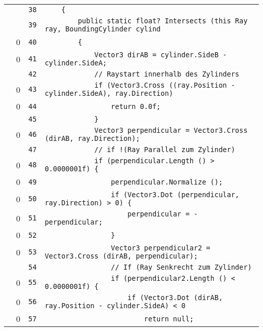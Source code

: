 \documentclass[a4paper,10pt]{article}
\begin{document}
\begin{longtable}[l]{lrrl}
\cellcolor{gray} &  & \verb~38~ & \verb~    {~\\
\cellcolor{gray} &  & \verb~39~ & \verb~        public static float? Intersects (this Ray ray, BoundingCylinder cylind~\\
\cellcolor{red} & 0 & \verb~40~ & \verb~        {~\\
\cellcolor{red} & 0 & \verb~41~ & \verb~            Vector3 dirAB = cylinder.SideB - cylinder.SideA;~\\
\cellcolor{gray} &  & \verb~42~ & \verb~            // Raystart innerhalb des Zylinders~\\
\cellcolor{red} & 0 & \verb~43~ & \verb~            if (Vector3.Cross ((ray.Position - cylinder.SideA), ray.Direction)~\\
\cellcolor{red} & 0 & \verb~44~ & \verb~                return 0.0f;~\\
\cellcolor{gray} &  & \verb~45~ & \verb~            }~\\
\cellcolor{red} & 0 & \verb~46~ & \verb~            Vector3 perpendicular = Vector3.Cross (dirAB, ray.Direction);~\\
\cellcolor{gray} &  & \verb~47~ & \verb~            // if !(Ray Parallel zum Zylinder)~\\
\cellcolor{red} & 0 & \verb~48~ & \verb~            if (perpendicular.Length () > 0.0000001f) {~\\
\cellcolor{red} & 0 & \verb~49~ & \verb~                perpendicular.Normalize ();~\\
\cellcolor{red} & 0 & \verb~50~ & \verb~                if (Vector3.Dot (perpendicular, ray.Direction) > 0) {~\\
\cellcolor{red} & 0 & \verb~51~ & \verb~                    perpendicular = -perpendicular;~\\
\cellcolor{red} & 0 & \verb~52~ & \verb~                }~\\
\cellcolor{red} & 0 & \verb~53~ & \verb~                Vector3 perpendicular2 = Vector3.Cross (dirAB, perpendicular);~\\
\cellcolor{gray} &  & \verb~54~ & \verb~                // If (Ray Senkrecht zum Zylinder)~\\
\cellcolor{red} & 0 & \verb~55~ & \verb~                if (perpendicular2.Length () < 0.0000001f) {~\\
\cellcolor{red} & 0 & \verb~56~ & \verb~                    if (Vector3.Dot (dirAB, ray.Position - cylinder.SideA) < 0~\\
\cellcolor{red} & 0 & \verb~57~ & \verb~                        return null;~\\

\end{longtable}
\end{document}
